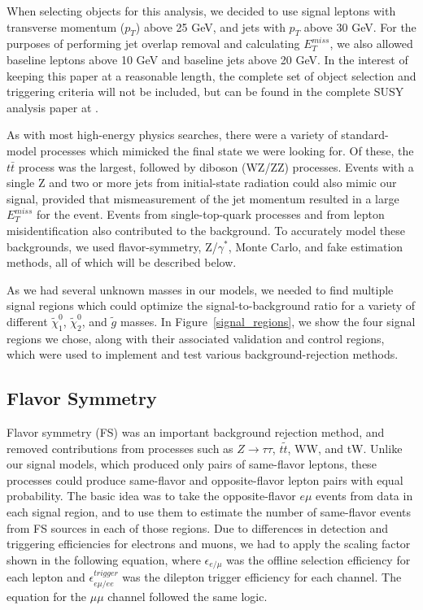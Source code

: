 When selecting objects for this analysis, we decided to use signal leptons with transverse momentum ($p_T$) above 25 GeV, and jets with $p_T$ above 30 GeV. For the purposes of performing jet overlap removal and calculating $E_T^{miss}$, we also allowed baseline leptons above 10 GeV and baseline jets above 20 GeV. In the interest of keeping this paper at a reasonable length, the complete set of object selection and triggering criteria will not be included, but can be found in the complete SUSY analysis paper at \cite{SUSY_2l2j}.

As with most high-energy physics searches, there were a variety of standard-model processes which mimicked the final state we were looking for. Of these, the $t\bar{t}$ process was the largest, followed by diboson (WZ/ZZ) processes. Events with a single Z and two or more jets from initial-state radiation could also mimic our signal, provided that mismeasurement of the jet momentum resulted in a large $E_T^{miss}$ for the event. Events from single-top-quark processes and from lepton misidentification also contributed to the background. To accurately model these backgrounds, we used flavor-symmetry, Z/$\gamma^*$, Monte Carlo, and fake estimation methods, all of which will be described below.

As we had several unknown masses in our models, we needed to find multiple signal regions which could optimize the signal-to-background ratio for a variety of different $\tilde{\chi}^0_1$, $\tilde{\chi}^0_2$, and $\tilde{g}$ masses. In Figure~\ref{signal_regions}, we show the four signal regions we chose, along with their associated validation and control regions, which were used to implement and test various background-rejection methods.

\subsection*{Flavor Symmetry}

Flavor symmetry (FS) was an important background rejection method, and removed contributions from processes such as $Z\rightarrow\tau\tau$, $t\tilde{t}$, WW, and tW. Unlike our signal models, which produced only pairs of same-flavor leptons, these processes could produce same-flavor and opposite-flavor lepton pairs with equal probability. The basic idea was to take the opposite-flavor $e\mu$ events from data in each signal region, and to use them to estimate the number of same-flavor events from FS sources in each of those regions. Due to differences in detection and triggering efficiencies for electrons and muons, we had to apply the scaling factor shown in the following equation, where $\epsilon_{e/\mu}$ was the offline selection efficiency for each lepton and $\epsilon_{e\mu/ee}^{trigger}$ was the dilepton trigger efficiency for each channel. The equation for the $\mu\mu$ channel followed the same logic.

